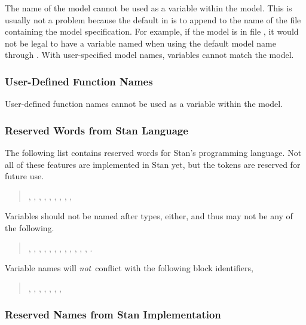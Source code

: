 The name of the model cannot be used as a variable within the model.
This is usually not a problem because the default in 
is to append  to the name of the file containing the
model specification.  For example, if the model is in file
, it would not be legal to have a variable named
 when using the default model name through
.  With user-specified model names, variables cannot
match the model.

\subsubsection{User-Defined Function Names}

User-defined function names cannot be used as a variable within the
model.

\subsubsection{Reserved Words from Stan Language}

The following list contains reserved words for Stan's programming
language.  Not all of these features are implemented in Stan yet, but
the tokens are reserved for future use.
%
\begin{quote}
,
,
,
,
,
,
,
,
,
\end{quote}
%
Variables should not be named after types, either, and thus may not be
any of the following.
%
\begin{quote}
,
,
,
,
,
,
,
,
,
,
,
,
.
\end{quote}
%
Variable names will {\it not}\ conflict with the following block identifiers,
%
\begin{quote}
,
,
,
,
,
,
,
\end{quote}
%

\subsubsection{Reserved Names from Stan Implementation}

